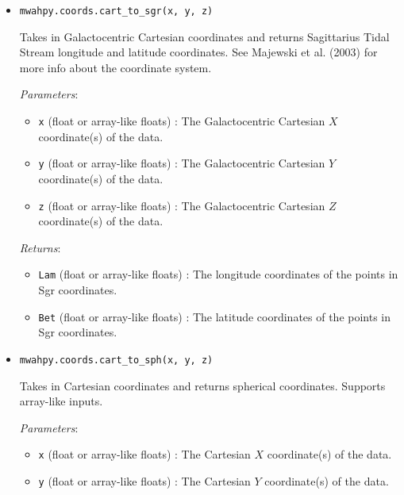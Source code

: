 \documentclass{article}
\begin{document}
\begin{itemize}
\begin{itemize}
\end{itemize}



\item \verb!mwahpy.coords.cart_to_sgr(x, y, z)!

Takes in Galactocentric Cartesian coordinates and returns Sagittarius Tidal Stream longitude and latitude coordinates. See Majewski et al. (2003) for more info about the coordinate system. 

\textit{Parameters}: \begin{itemize}

\item \verb!x! (float or array-like floats) : The Galactocentric Cartesian $X$ coordinate(s) of the data.

\item \verb!y! (float or array-like floats) : The Galactocentric Cartesian $Y$ coordinate(s) of the data.

\item \verb!z! (float or array-like floats) : The Galactocentric Cartesian $Z$ coordinate(s) of the data.

\end{itemize}

\textit{Returns}: \begin{itemize}

\item \verb!Lam! (float or array-like floats) : The longitude coordinates of the points in Sgr coordinates.

\item \verb!Bet! (float or array-like floats) : The latitude coordinates of the points in Sgr coordinates.

\end{itemize}



\item \verb!mwahpy.coords.cart_to_sph(x, y, z)!

Takes in Cartesian coordinates and returns spherical coordinates. Supports array-like inputs.

\textit{Parameters}: \begin{itemize}

\item \verb!x! (float or array-like floats) : The Cartesian $X$ coordinate(s) of the data.

\item \verb!y! (float or array-like floats) : The Cartesian $Y$ coordinate(s) of the data.


\end{itemize}
\end{itemize}
\end{document}
